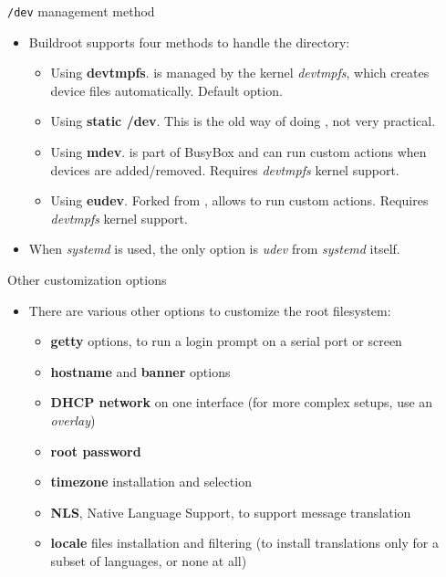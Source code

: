 \begin{frame}{{\tt /dev} management method}
  \begin{itemize}
  \item Buildroot supports four methods to handle the 
    directory:
    \begin{itemize}
    \item Using {\bf devtmpfs}.  is managed by the kernel
      {\em devtmpfs}, which creates device files automatically.
      Default option.
    \item Using {\bf static /dev}. This is the old way of doing
      , not very practical.
    \item Using {\bf mdev}.  is part of BusyBox and can run
      custom actions when devices are added/removed. Requires {\em
        devtmpfs} kernel support.
    \item Using {\bf eudev}. Forked from , allows to run
      custom actions. Requires {\em devtmpfs} kernel support.
    \end{itemize}
  \item When {\em systemd} is used, the only option is {\em udev} from
    {\em systemd} itself.
  \end{itemize}
\end{frame}

\begin{frame}{Other customization options}
  \begin{itemize}
  \item There are various other options to customize the root
    filesystem:
    \begin{itemize}
    \item {\bf getty} options, to run a login prompt on a serial port
      or screen
    \item {\bf hostname} and {\bf banner} options
    \item {\bf DHCP network} on one interface (for more complex
      setups, use an {\em overlay})
    \item {\bf root password}
    \item {\bf timezone} installation and selection
    \item {\bf NLS}, Native Language Support, to support message
      translation
    \item {\bf locale} files installation and filtering (to install
      translations only for a subset of languages, or none at all)
    \end{itemize}
  \end{itemize}
\end{frame}


